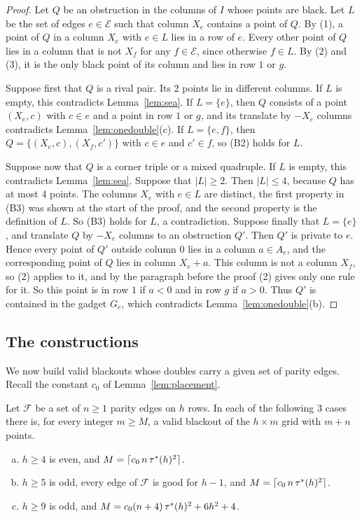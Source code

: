 \begin{proof}
Let $Q$ be an obstruction in the columns of $I$ whose points are black. Let $L$ be the set
of edges $e\in\mathcal E$ such that column $X_e$ contains a point of $Q$. By (1), a point of
$Q$ in a column $X_e$ with $e\in L$ lies in a row of $e$. Every other point of $Q$ lies in
a column that is not $X_f$ for any $f\in\mathcal E$, since otherwise $f\in L$. By (2) and
(3), it is the only black point of its column and lies in row $1$ or $g$.

Suppose first that $Q$ is a rival pair. Its 2 points lie in different columns. If $L$ is
empty, this contradicts Lemma~\ref{lem:sea}. If $L=\{e\}$, then $Q$ consists of a point $(X_e,c)$ with
$c\in e$ and a point in row $1$ or $g$, and its translate by $-X_e$ columns contradicts
Lemma~\ref{lem:onedouble}(c). If $L=\{e,f\}$, then $Q=\{(X_e,c),(X_f,c')\}$ with $c\in e$
and $c'\in f$, so (B2) holds for $L$.

Suppose now that $Q$ is a corner triple or a mixed quadruple. If $L$ is empty, this
contradicts Lemma~\ref{lem:sea}. Suppose that $|L|\ge2$. Then $|L|\le4$, because $Q$ has at most 4 points. The columns $X_e$
with $e\in L$ are distinct, the first property in (B3) was shown at the start of the
proof, and the second property is the definition of $L$. So (B3) holds for $L$, a
contradiction.
Suppose finally that $L=\{e\}$, and translate $Q$ by $-X_e$ columns to an obstruction $Q'$.
Then $Q'$ is private to $e$. Hence every point of $Q'$ outside column $0$ lies in a column
$a\in A_e$, and the corresponding point of $Q$ lies in column $X_e+a$. This column is
not a column $X_f$, so (2) applies to it, and by the paragraph before the proof (2) gives
only one rule for it. So this point is in row $1$ if $a<0$ and in row $g$ if $a>0$. Thus $Q'$ is contained
in the gadget $G_e$, which contradicts Lemma~\ref{lem:onedouble}(b).
\end{proof}

\subsection{The constructions}

We now build valid blackouts whose doubles carry a given set of parity edges. Recall the
constant $c_0$ of Lemma~\ref{lem:placement}.

\begin{proposition}\label{prop:partial}
Let $\mathcal F$ be a set of $n\ge1$ parity edges on $h$ rows. In each of the following
3 cases there is, for every integer $m\ge M$, a valid blackout of the $h\times m$ grid with
$m+n$ points.
\begin{enumerate}[(a)]
\item $h\ge4$ is even, and $M=\lceil c_0\,n\,{\tau^*}(h)^2\rceil$.
\item $h\ge5$ is odd, every edge of $\mathcal F$ is good for $h-1$, and
$M=\lceil c_0\,n\,{\tau^*}(h)^2\rceil$.
\item $h\ge9$ is odd, and $M=c_0(n+4)\,{\tau^*}(h)^2+6h^2+4$.
\end{enumerate}
\end{proposition}

